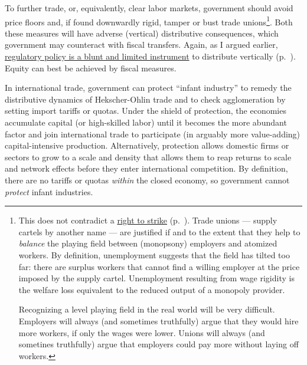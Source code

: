 To further trade, or, equivalently, clear labor markets, government should avoid price floors and, if found downwardly rigid, tamper or bust trade unions\footnote{
	This does not contradict a \hyperref[sec:redistributive-policy]{right to strike} (p.~\pageref{sec:redistributive-policy}). Trade unions --- supply cartels by another name --- are justified if and to the extent that they help to \emph{balance} the playing field between (monopsony) employers and atomized workers. By definition, unemployment suggests that the field has tilted too far: there are surplus workers that cannot find a willing employer at the price imposed by the supply cartel. Unemployment resulting from wage rigidity is the welfare loss equivalent to the reduced output of a monopoly provider.
	
	Recognizing a level playing field in the real world will be very difficult. Employers will always (and sometimes truthfully) argue that they would hire more workers, if only the wages were lower. Unions will always (and sometines truthfully) argue that employers could pay more without laying off workers.}. 
Both these measures will have adverse (vertical) distributive consequences, which government may counteract with fiscal transfers. Again, as I argued earlier, \hyperref[sec:redistributive-policy]{regulatory policy is a blunt and limited instrument} to distribute vertically (p.~\pageref{sec:redistributive-policy}). Equity can best be achieved by fiscal measures.

In international trade, government can protect ``infant industry'' to remedy the distributive dynamics of Hekscher-Ohlin trade and to check agglomeration by setting import tariffs or quotas. Under the shield of protection, the economies accumulate capital (or high-skilled labor) until it becomes the more abundant factor and join international trade to participate (in arguably more value-adding) capital-intensive production. Alternatively, protection allows domestic firms or sectors to grow to a scale and density that allows them to reap returns to scale and network effects before they enter international competition. By definition, there are no tariffs or quotas \emph{within} the closed economy, so government cannot \emph{protect} infant industries. %

